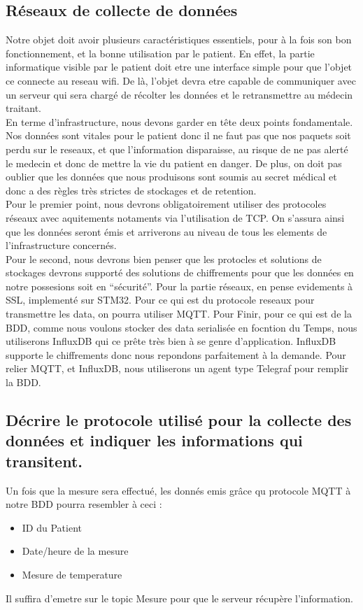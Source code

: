 \documentclass[10pt,a4paper]{article}
\begin{document}
\subsection{Réseaux de collecte de données}
Notre objet doit avoir plusieurs caractéristiques essentiels, pour à la fois son bon fonctionnement, et la bonne utilisation par le patient. En effet, la partie informatique visible par le patient doit etre une interface simple pour que l'objet ce connecte au reseau wifi. De là, l'objet devra etre capable de communiquer avec un serveur qui sera chargé de récolter les données et le retransmettre au médecin traitant.\\ 
En terme d'infrastructure, nous devons garder en tête deux points fondamentale. Nos données sont vitales pour le patient donc il ne faut pas que nos paquets soit perdu sur le reseaux, et que l'information disparaisse, au risque de ne pas alerté le medecin et donc de mettre la vie du patient en danger. De plus, on doit pas oublier que les données que nous produisons sont soumis au secret médical et donc a des règles très strictes de stockages et de retention.\\
Pour le premier point, nous devrons obligatoirement utiliser des protocoles réseaux avec aquitements notaments via l'utilisation de TCP. On s'assura ainsi que les données seront émis et arriverons au niveau de tous les elements de l'infrastructure concernés. \\
Pour le second, nous devrons bien penser que les protocles et solutions de stockages devrons supporté des solutions de chiffrements pour que les données en notre possesions soit en ``sécurité''. Pour la partie réseaux, en pense evidements à SSL, implementé  sur STM32.
Pour ce qui est du protocole reseaux pour transmettre les data, on pourra utiliser MQTT. 
Pour Finir, pour ce qui est de la BDD, comme nous voulons stocker des data serialisée en focntion du Temps, nous utiliserons InfluxDB qui ce prête très bien à se genre d'application. InfluxDB supporte le chiffrements donc nous repondons parfaitement à la demande. Pour relier MQTT, et InfluxDB, nous utiliserons un agent type Telegraf pour remplir la BDD. 


\subsection{Décrire le protocole utilisé pour la collecte des données et indiquer les informations qui transitent.}
Un fois que la mesure sera effectué, les donnés emis grâce qu protocole MQTT à notre BDD pourra resembler à ceci : 
\begin{itemize}
 \item ID du Patient
 \item Date/heure de la mesure
 \item Mesure de temperature
\end{itemize}
Il suffira d'emetre sur le topic Mesure pour que le serveur récupère l'information. 
\end{document}
